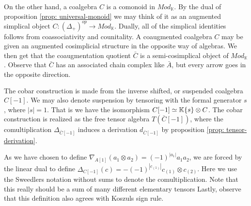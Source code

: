\documentclass[../thesis.tex]{subfiles}
\begin{document}
            On the other hand, a coalgebra $C$ is a comonoid in $Mod_\mathbb{K}$. By the dual of proposition \ref{prop: universal-monoid} we may think of it as an augmented simplical object $C:(\Delta_+)^{op} \rightarrow Mod_\mathbb{K}$. Dually, all of the simplical identities follows from coassociativity and counitality. A coaugmented coalgebra $C$ may be given an augmented cosimplicial structure in the opposite way of algebras. We then get that the coaugmentation quotient $\bar{C}$ is a semi-cosimplical object of $Mod_\mathbb{K}$. Observe that $\bar{C}$ has an associated chain complex like $\bar{A}$, but every arrow goes in the opposite direction.

            \begin{center}

            \end{center}
            
            The cobar construction is made from the inverse shifted, or suspended coalgebra $C[-1]$. We may also denote suspension by tensoring with the formal generator $s$, where $|s| = 1$. That is we have the isomorphism $C[-1] \simeq \mathbb{K}\{s\}\otimes C$. The cobar construction is realized as the free tensor algebra $T(\bar{C}[-1])$, where the comultiplication $\Delta_{\bar{C}[-1]}$ induces a derivation $d_{\bar{C}[-1]}$ by proposition \ref{prop: tensor-derivation}.

            \begin{remark}
                As we have chosen to define $\nabla_{A[1]}(a_1\otimes a_2)=(-1)^{|a_1|}a_1a_2$, we are forced by the linear dual to define $\Delta_{C[-1]}(c)=-(-1)^{|c_{(1)}|}c_{(1)}\otimes c_{(2)}$. Here we use the Sweedlers notation without sums to denote the comultiplication. Note that this really should be a sum of many different elementary tensors Lastly, observe that this definition also agrees with Koszuls sign rule.
            \end{remark}
\end{document}

